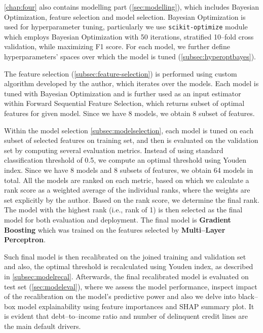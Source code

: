 \autoref{chap:four} also contains modelling part (\autoref{sec:modelling}), which includes Bayesian Optimization, feature selection and model selection.
Bayesian Optimization is used for hyperparameter tuning, particularly we use \lstinline{scikit-optimize} module which employs Bayesian Optimization with 50 iterations, stratified 10--fold cross validation, while maximizing F1 score. For each model, we further define hyperparameters' spaces over which the model is tuned (\autoref{subsec:hyperoptbayes}).

The feature selection (\autoref{subsec:feature-selection}) is performed using custom algorithm developed by the author, which iterates over the models. Each model is tuned with Bayesian Optimization and is further used as an input estimator within Forward Sequential Feature Selection, which returns subset of optimal features for given model. Since we have 8 models, we obtain 8 subset of features.

Within the model selection \autoref{subsec:modelselection}, each model is tuned on each subset of selected features on training set, and then is evaluated on the validation set by computing several evaluation metrics.
Instead of using standard classification threshold of 0.5, we compute an optimal threshold using Youden index. Since we have 8 models and 8 subsets of features, we obtain 64 models in total.
All the models are ranked on each metric, based on which we calculate a rank score as a weighted average of the individual ranks, where the weights are set explicitly by the author. Based on the rank score, we determine the final rank. The model with the highest rank (i.e., rank of 1) is then selected as the final model for both evaluation and deployment.
The final model is \textbf{Gradient Boosting} which was trained on the features selected by \textbf{Multi--Layer Perceptron}.

Such final model is then recalibrated on the joined training and validation set and also, the optimal threshold is recalculated using Youden index, as described in \autoref{subsec:modelrecal}.
Afterwards, the final recalibrated model is evaluated on test set (\autoref{sec:modeleval}), where we assess the model performance, inspect impact of the recalibration on the model's predictive power and also we delve into black--box model explainability using feature importances and SHAP summary plot. It is evident that debt--to--income ratio and number of delinquent credit lines are the main default drivers.

